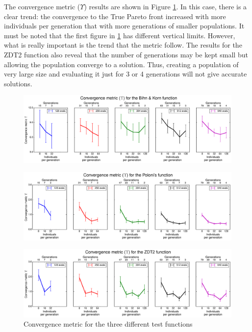 The convergence metric ($\Upsilon$) results are shown in Figure \ref{fig:convMetric}. In this case, there is a clear trend: the convergence to the True Pareto front increased with more individuals per generation that with more generations of smaller populations. It must be noted that the first figure in \ref{fig:convMetric} has different vertical limits. However, what is really important is the trend that the metric follow. The results for the ZDT2 function also reveal that the number of generations may be kept small but allowing the population converge to a solution. Thus, creating a population of very large size and evaluating it just for 3 or 4 generations will not give accurate solutions. 

    \newpage
    
    \begin{figure}[h!]
        \centering
        \includegraphics[width=\textwidth]{Figures/3/convMetric_BK.pdf}
    \end{figure}
    \begin{figure}[h!]
        \centering
        \includegraphics[width=\textwidth]{Figures/3/convMetric_POL.pdf}
    \end{figure}
    \begin{figure}[h!]
        \centering
        \includegraphics[width=\textwidth]{Figures/3/convMetric_ZDT.pdf}
        \caption{Convergence metric for the three different test functions}
        \label{fig:convMetric}
    \end{figure}
   
